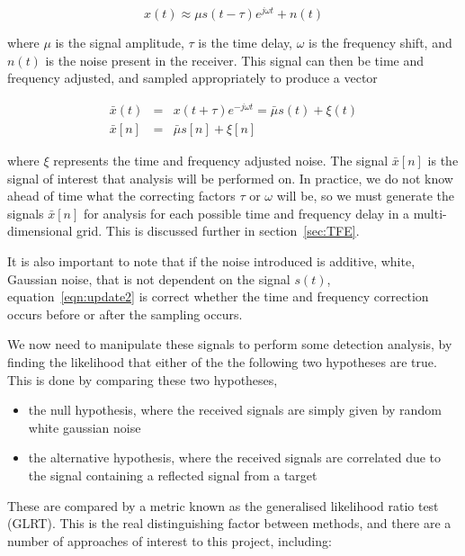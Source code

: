 \documentclass[12pt,openany,a4paper]{book}
\begin{document}
\begin{equation}
\label{eqn:approx}
x(t) \approx \mu s(t-\tau) e^{j\omega t} + n(t)
\end{equation}

\bigskip

where $\mu$ is the signal amplitude, $\tau$ is the time delay, $\omega$ is the frequency shift, and $n(t)$ is the noise present in the receiver. This signal can then be time and frequency adjusted, and sampled appropriately to produce a vector

\begin{eqnarray}
\label{eqn:update}
\bar{x}(t) & = & x(t+\tau) e^{-j\omega t} = \bar{\mu} s(t) + \xi(t) \\
\label{eqn:update2}
\bar{x}[n] & = & \bar{\mu}s[n] + \xi[n]
\end{eqnarray}

\bigskip

where $\xi$ represents the time and frequency adjusted noise. The signal $\bar{x}[n]$ is the signal of interest that analysis will be performed on. In practice, we do not know ahead of time what the correcting factors $\tau$ or $\omega$ will be, so we must generate the signals $\bar{x}[n]$ for analysis for each possible time and frequency delay in a multi-dimensional grid. This is discussed further in section~\ref{sec:TFE}.

\bigskip

It is also important to note that if the noise introduced is additive, white, Gaussian noise, that is not dependent on the signal $s(t)$,  equation~\ref{eqn:update2} is correct whether the time and frequency correction occurs before or after the sampling occurs. 

\bigskip

We now need to manipulate these signals to perform some detection analysis, by finding the likelihood that either of the the following two hypotheses are true. This is done by comparing these two hypotheses,

\begin{itemize}
\item{the null hypothesis, where the received signals are simply given by random white gaussian noise}
\item{the alternative hypothesis, where the received signals are correlated due to the signal containing a reflected signal from a target}
\end{itemize}

\bigskip

These are compared by a metric known as the generalised likelihood ratio test (GLRT). This is the real distinguishing factor between methods, and there are a number of approaches of interest to this project, including:
\end{document}
